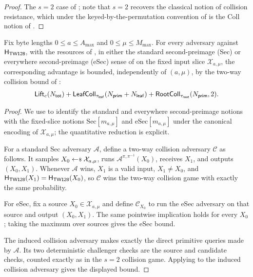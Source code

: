 \begin{proof}
The $s = 2$ case of ; \cite{BH22} note that $s = 2$
recovers the classical notion of collision resistance, which under the
keyed-by-the-permutation convention of  is the
Coll notion of \cite{RS04}.
\end{proof}

\begin{corollary}
\label{cor:second-preimage-rs04}
Fix byte lengths $0 \leq a \leq A_{\max}$ and
$0 \leq \mu \leq M_{\max}$. For every adversary against $\mathsf{H}_{\mathsf{TW128}}$, with the
resources of , in either the standard
second-preimage (Sec) or everywhere second-preimage (eSec) sense of
\cite{RS04} on the fixed input slice $\mathcal{X}_{a,\mu}$, the
corresponding advantage is bounded, independently of $(a, \mu)$, by the
two-way collision bound of
:
\[
  \mathsf{Lift}_c(N_{\mathsf{tot}})
  + \mathsf{LeafColl}_{\tau_{\mathsf{leaf}}}(N_{\mathsf{prim}}+N_{\mathsf{leaf}})
  + \mathsf{RootColl}_{\tau_{\mathsf{root}}}(N_{\mathsf{prim}}, 2).
\]
\end{corollary}

\begin{proof}
We use \cite{RS04} to identify the standard and everywhere second-preimage
notions with the fixed-slice notions
$\mathrm{Sec}[m_{a,\mu}]$ and $\mathrm{eSec}[m_{a,\mu}]$ under the
canonical encoding of $\mathcal{X}_{a,\mu}$; the quantitative reduction
is explicit.

For a standard Sec adversary $\mathcal{A}$, define a two-way collision
adversary $\mathcal{C}$ as follows. It samples
$X_0 \sample \mathcal{X}_{a,\mu}$, runs
$\mathcal{A}^{\pi,\pi^{-1}}(X_0)$, receives $X_1$, and outputs
$(X_0,X_1)$. Whenever $\mathcal{A}$ wins, $X_1$ is a valid input,
$X_1 \neq X_0$, and $\mathsf{H}_{\mathsf{TW128}}(X_1)=\mathsf{H}_{\mathsf{TW128}}(X_0)$, so $\mathcal{C}$ wins the
two-way collision game with exactly the same probability.

For eSec, fix a source $X_0 \in \mathcal{X}_{a,\mu}$ and define
$\mathcal{C}_{X_0}$ to run the eSec adversary on that source and output
$(X_0,X_1)$. The same pointwise implication holds for every $X_0$; taking
the maximum over sources gives the eSec bound.

The induced collision adversary makes exactly the direct primitive queries
made by $\mathcal{A}$. Its two deterministic challenger checks are the
source and candidate checks, counted exactly as in the $s=2$ collision
game. Applying  to the induced collision adversary
gives the displayed bound.
\end{proof}

